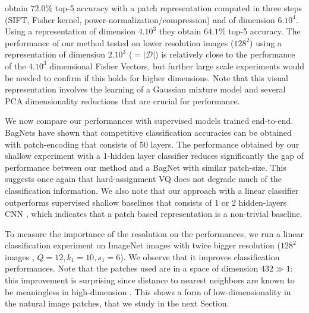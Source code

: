 \documentclass{article}
\begin{document}
\cite{sanchez2013image} obtain $72.0\%$ top-5 accuracy with a patch representation computed in three steps (SIFT, Fisher kernel, power-normalization/compression) and of dimension $6.10^4$.
Using a representation of dimension $4.10^3$ they obtain $64.1\%$ top-5 accuracy.
The performance of our method tested on lower resolution images ($128^2$) using a representation of dimension $2.10^3$ ($=|\mathcal{D}|$) is relatively close to the performance of the $4.10^3$ dimensional Fisher Vectors, but further large scale experiments would be needed to confirm if this holds for higher dimensions.
Note that this visual representation involves the learning of a Gaussian mixture model and several PCA dimensionality reductions that are crucial for performance.

We now compare our performances with supervised models trained end-to-end.
BagNets \citep{brendel2019approximating} have shown that  competitive classification accuracies can be obtained with patch-encoding that consists of 50 layers.
The performance obtained by our shallow experiment with a 1-hidden layer classifier reduces significantly the gap of performance between our method and a BagNet with similar patch-size.
This suggests once again that hard-assignment VQ does not degrade much of the classification information.
We also note that our approach with a linear classifier outperforms supervised shallow baselines that consists of 1 or 2 hidden-layers CNN \citep{belilovsky2018greedy}, which indicates that a patch based representation is a non-trivial baseline.

To measure the importance of the resolution on the performances, we run a linear classification experiment on ImageNet images with twice bigger resolution ($128^2$ images , $Q=12, k_1=10,s_1=6$).
We observe that it improves classification performances.
Note that the patches used are in a space of dimension $432 \gg 1$: this improvement is surprising since distance to nearest neighbors are known to be meaningless in high-dimension \citep{beyer1999nearest}.
This shows a form of low-dimensionality in the natural image patches, that we study in the next Section.
\end{document}
